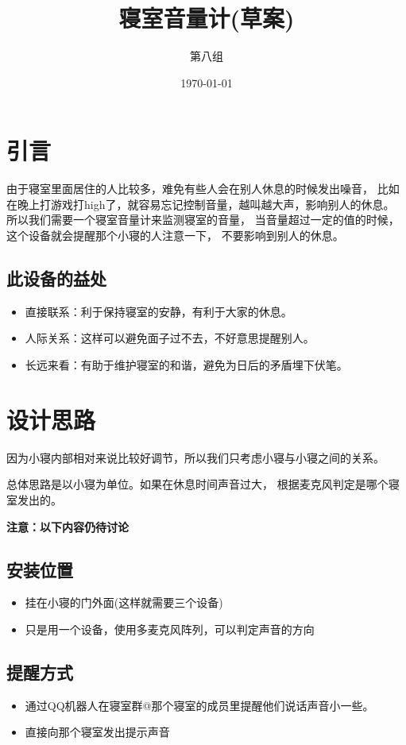 \documentclass[12pt, a4paper, oneside]{ctexart}
\title{寝室音量计(草案)}
\author{第八组}
\date{\today}
\begin{document}
\maketitle

\section{引言}
由于寝室里面居住的人比较多，难免有些人会在别人休息的时候发出噪音，
比如在晚上打游戏打high了，就容易忘记控制音量，越叫越大声，影响别人的休息。
所以我们需要一个寝室音量计来监测寝室的音量，
当音量超过一定的值的时候，这个设备就会提醒那个小寝的人注意一下，
不要影响到别人的休息。
\subsection*{此设备的益处}
\begin{itemize}
    \item 直接联系：利于保持寝室的安静，有利于大家的休息。
    \item 人际关系：这样可以避免面子过不去，不好意思提醒别人。
    \item 长远来看：有助于维护寝室的和谐，避免为日后的矛盾埋下伏笔。
\end{itemize}

\section{设计思路}
因为小寝内部相对来说比较好调节，所以我们只考虑小寝与小寝之间的关系。

总体思路是以小寝为单位。如果在休息时间声音过大，
根据麦克风判定是哪个寝室发出的。



\textbf{ 注意：以下内容仍待讨论}

\subsection{安装位置}

\begin{itemize}
    \item 挂在小寝的门外面(这样就需要三个设备)
    \item 只是用一个设备，使用多麦克风阵列，可以判定声音的方向
\end{itemize}

\subsection{提醒方式}
\begin{itemize}
    \item 通过QQ机器人在寝室群@那个寝室的成员里提醒他们说话声音小一些。
    \item 直接向那个寝室发出提示声音
\end{itemize}
\end{document}
